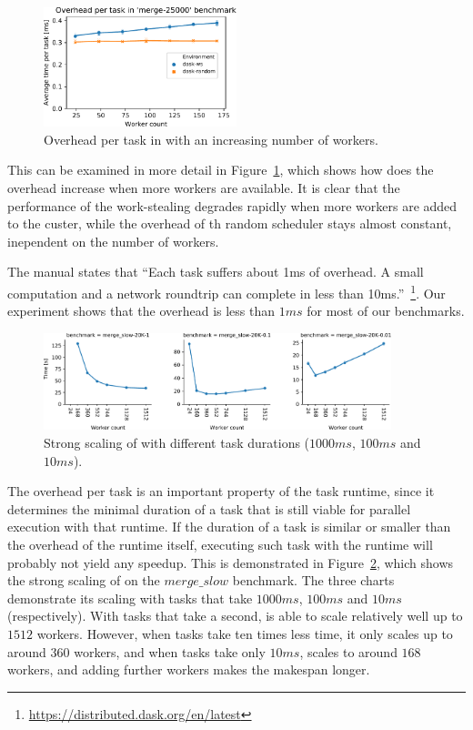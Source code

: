 \begin{figure}
	\centering
	\includegraphics[width=0.5\textwidth]{imgs/rsds/charts/dask-merge-worker-scaling}
	\caption{Overhead per task in \dask{} with an increasing number of workers.}
	\label{fig:dask-merge-worker-scaling}
\end{figure}

This can be examined in more detail in Figure~\ref{fig:dask-merge-worker-scaling}, which shows how does the
overhead increase when more workers are available. It is clear that the performance of the
work-stealing degrades rapidly when more workers are added to the custer, while the overhead of th
random scheduler stays almost constant, inependent on the number of workers.

The \dask{} manual states that ``Each task suffers about 1ms of overhead. A small
computation and a network roundtrip can complete in less than 10ms.''~\footnote{\url{https://distributed.dask.org/en/latest}}. Our
experiment shows that the overhead is less than $1ms$ for most of our benchmarks.

\begin{figure}
	\centering
	\includegraphics[width=0.9\textwidth]{imgs/rsds/charts/dask-strong-scaling}
	\caption{Strong scaling of \dask{} with different task durations ($1000ms$, $100ms$ and
		$10ms$).}
	\label{fig:dask-strong-scaling}
\end{figure}

The overhead per task is an important property of the task runtime, since it determines the minimal
duration of a task that is still viable for parallel execution with that runtime. If the duration
of a task is similar or smaller than the overhead of the runtime itself, executing such task with
the runtime will probably not yield any speedup. This is demonstrated in
Figure~\ref{fig:dask-strong-scaling}, which shows the strong scaling of \dask{} on the
$merge\_slow$ benchmark. The three charts demonstrate its scaling with tasks that take $1000ms$, $100ms$
and $10ms$ (respectively). With tasks that take a second, \dask{} is able to scale relatively
well up to $1512$ workers. However, when tasks take ten times less time, it only scales up to
around $360$ workers, and when tasks take only $10ms$, \dask{} scales to around $168$ workers,
and adding further workers makes the makespan longer.

